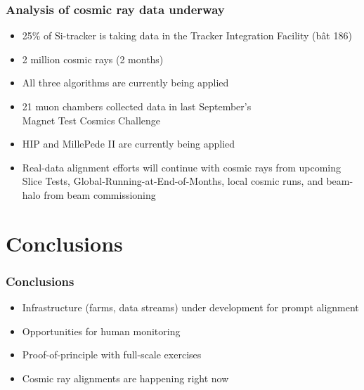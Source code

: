 \documentclass[compress]{beamer}
\begin{document}
\begin{frame}
\frametitle{Analysis of cosmic ray data underway}
\begin{itemize}
\item<1-> 25\% of Si-tracker is taking data in the Tracker Integration Facility (b\^at 186)
\item<1-> 2 million cosmic rays (2 months)
\item<1-> All three algorithms are currently being applied

\vfill
\item<2-> 21 muon chambers collected data in last September's \\
Magnet Test Cosmics Challenge
\item<2-> HIP and MillePede II are currently being applied

\vfill
\item<3-> Real-data alignment efforts will continue with cosmic rays
from upcoming Slice Tests, Global-Running-at-End-of-Months, local
cosmic runs, and beam-halo from beam commissioning
\end{itemize}
\end{frame}

\section*{Conclusions}

\begin{frame}
\frametitle{Conclusions}
\begin{itemize}\setlength{\itemsep}{0.75 cm}
\item Infrastructure (farms, data streams) under development for prompt alignment
\item Opportunities for human monitoring
\item Proof-of-principle with full-scale exercises
\item Cosmic ray alignments are happening right now
\end{itemize}
\label{numpages}
\end{frame}
\end{document}
